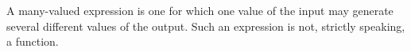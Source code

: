 A many-valued expression is one for which one value of
the input may generate several different values
of the output. Such an expression is not, strictly
speaking, a function.